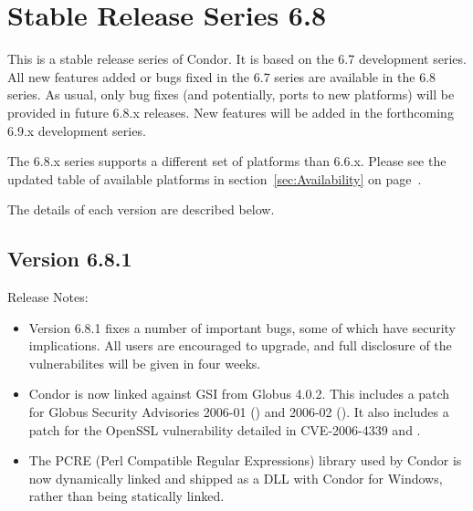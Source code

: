 \section{\label{sec:History-6-8}Stable Release Series 6.8}

This is a stable release series of Condor.
It is based on the 6.7 development series.
All new features added or bugs fixed in the 6.7 series are available
in the 6.8 series.
As usual, only bug fixes (and potentially, ports to new platforms)
will be provided in future 6.8.x releases.
New features will be added in the forthcoming 6.9.x development series.


The 6.8.x series supports a different set of platforms than 6.6.x.
Please see the updated table of available platforms in
section~\ref{sec:Availability} on page~\pageref{sec:Availability}.

The details of each version are described below.


\subsection*{\label{sec:New-6-8-1}Version 6.8.1}

\noindent Release Notes:

\begin{itemize}

\item Version 6.8.1 fixes a number of important bugs, some of which have
security implications.  All users are encouraged to upgrade, and full
disclosure of the vulnerabilites will be given in four weeks.

\item Condor is now linked against GSI from Globus 4.0.2. This includes
a patch for Globus Security Advisories 2006-01 
()
and 2006-02 
().
It also includes a
patch for the OpenSSL vulnerability detailed in CVE-2006-4339 and
.

\item The PCRE (Perl Compatible Regular Expressions) library used by
Condor is now dynamically linked and shipped as a DLL with Condor for
Windows, rather than being statically linked.

\end{itemize}


